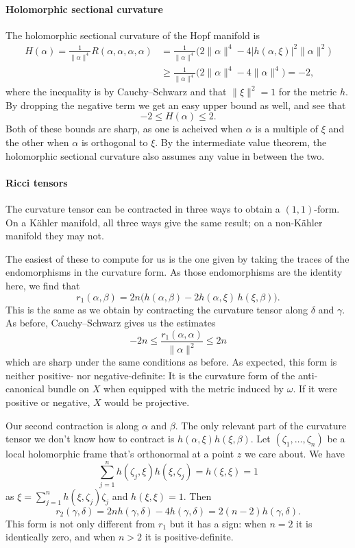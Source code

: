 \documentclass[11pt]{article}
\begin{document}
\paragraph{Holomorphic sectional curvature}
\label{sec:org6471503}

The holomorphic sectional curvature of the Hopf manifold is
\begin{align*}
H(\alpha)
= \frac{1}{\|\alpha\|^4} R(\alpha, \alpha, \alpha, \alpha)
&= \frac{1}{\|\alpha\|^4} \bigl( 2 \|\alpha\|^4 - 4 |h(\alpha, \xi)|^2 \|\alpha\|^2 \bigr)
\\
&\geq \frac{1}{\|\alpha\|^4}\bigl( 2 \|\alpha\|^4 - 4 \|\alpha\|^4\bigr)
= -2,
\end{align*}
where the inequality is by Cauchy--Schwarz and that \(\|\xi\|^2 = 1\) for the metric \(h\). By dropping the negative term we get an easy upper bound as well, and see that
$$
-2 \leq H(\alpha) \leq 2.
$$
Both of these bounds are sharp, as one is acheived when \(\alpha\) is a multiple of \(\xi\) and the other when \(\alpha\) is orthogonal to \(\xi\). By the intermediate value theorem, the holomorphic sectional curvature also assumes any value in between the two.


\paragraph{Ricci tensors}
\label{sec:org3942125}

The curvature tensor can be contracted in three ways to obtain a \((1,1)\)-form. On a K\"ahler manifold, all three ways give the same result; on a non-K\"ahler manifold they may not.

The easiest of these to compute for us is the one given by taking the traces of the endomorphisms in the curvature form. As those endomorphisms are the identity here, we find that
$$
r_1(\alpha, \beta)
= 2n \bigl( h(\alpha, \beta) - 2 h(\alpha, \xi) \, h(\xi, \beta) \bigr).
$$
This is the same as we obtain by contracting the curvature tensor along \(\delta\) and \(\gamma\). As before, Cauchy--Schwarz gives us the estimates
$$
-2n
\leq \frac{r_1(\alpha, \alpha)}{\|\alpha\|^2}
\leq 2n
$$
which are sharp under the same conditions as before. As expected, this form is neither positive- nor negative-definite: It is the curvature form of the anti-canonical bundle on \(X\) when equipped with the metric induced by \(\omega\). If it were positive or negative, \(X\) would be projective.

Our second contraction is along \(\alpha\) and \(\beta\). The only relevant part of the curvature tensor we don't know how to contract is \(h(\alpha, \xi)h(\xi, \beta)\). Let \((\zeta_1, \ldots, \zeta_n)\) be a local holomorphic frame that's orthonormal at a point \(z\) we care about. We have
$$
\sum_{j=1}^n h(\zeta_j, \xi) h(\xi, \zeta_j) = h(\xi, \xi) = 1
$$
as \(\xi = \sum_{j=1}^n h(\xi, \zeta_j) \zeta_j\) and \(h(\xi,\xi) = 1\).
Then
$$
r_2(\gamma, \delta)
= 2n h(\gamma, \delta) - 4 h(\gamma, \delta)
= 2(n-2) h(\gamma, \delta).
$$
This form is not only different from \(r_1\) but it has a sign: when \(n = 2\) it is identically zero, and when \(n > 2\) it is positive-definite.
\end{document}
